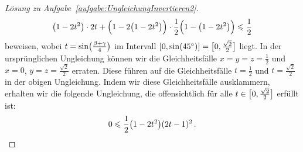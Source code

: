 \begin{proof}[Lösung zu Aufgabe~\ref{aufgabe:UngleichungInvertieren2}]
\begin{equation*}
		\parens*{1-2t^2}\cdot 2t+\parens[\Big]{1-2\parens*{1-2t^2}}\cdot\frac12\parens[\Big]{1-\parens*{1-2t^2}}\leqslant \frac12
	\end{equation*}
	beweisen, wobei $t=\sin\parens[\big]{\frac{\beta+\gamma}{4}}$ im Intervall $[0,\sin(45^\circ)]=\brackets[\big]{0,\frac{\sqrt{2}}{2}}$ liegt. In der ursprünglichen Ungleichung können wir die Gleichheitsfälle $x=y=z=\frac12$ und $x=0$, $y=z=\frac{\sqrt{2}}{2}$ erraten. Diese führen auf die Gleichheitsfälle $t=\frac12$ und $t=\frac{\sqrt{2}}{2}$ in der obigen Ungleichung. Indem wir diese Gleichheitsfälle ausklammern, erhalten wir die folgende Ungleichung, die offensichtlich für alle $t\in \brackets[\big]{0,\frac{\sqrt{2}}{2}}$ erfüllt ist:
	\begin{equation*}
		0\leqslant \frac12\parens*{1-2t^2}(2t-1)^2\,.\qedhere
	\end{equation*}
\end{proof}
